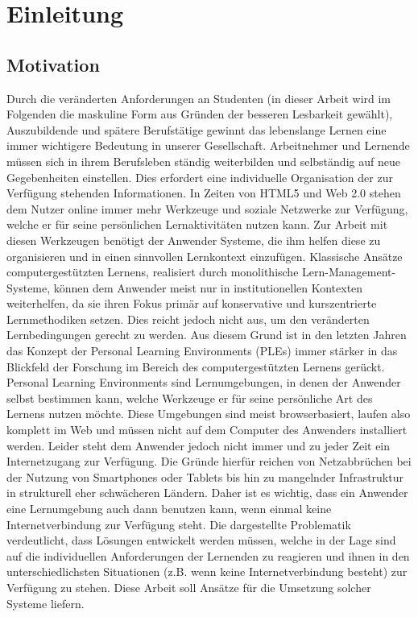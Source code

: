 \chapter{Einleitung}\label{chapter:Kapitel1}

\section{Motivation}
Durch die veränderten Anforderungen an Studenten (in dieser Arbeit wird im Folgenden die maskuline Form aus Gründen der besseren Lesbarkeit gewählt), Auszubildende und spätere Berufstätige gewinnt das lebenslange Lernen eine immer wichtigere Bedeutung in unserer Gesellschaft. Arbeitnehmer und Lernende müssen sich in ihrem Berufsleben ständig weiterbilden und selbständig auf neue Gegebenheiten einstellen. Dies erfordert eine individuelle Organisation der zur Verfügung stehenden Informationen. In Zeiten von HTML5 und Web 2.0 stehen dem Nutzer online immer mehr Werkzeuge und soziale Netzwerke zur Verfügung, welche er für seine persönlichen Lernaktivitäten nutzen kann. Zur Arbeit mit diesen Werkzeugen benötigt der Anwender Systeme, die ihm helfen diese zu organisieren und in einen sinnvollen Lernkontext einzufügen. Klassische Ansätze computergestützten Lernens, realisiert durch monolithische Lern-Management-Systeme, können dem Anwender meist nur in institutionellen Kontexten weiterhelfen, da sie ihren Fokus primär auf konservative und kurszentrierte Lernmethodiken setzen. Dies reicht jedoch nicht aus, um den veränderten Lernbedingungen gerecht zu werden. Aus diesem Grund ist in den letzten Jahren das Konzept der Personal Learning Environments (PLEs) immer stärker in das Blickfeld der Forschung im Bereich des computergestützten Lernens gerückt. Personal Learning Environments sind Lernumgebungen, in denen der Anwender selbst bestimmen kann, welche Werkzeuge er für seine persönliche Art des Lernens nutzen möchte. Diese Umgebungen sind meist browserbasiert, laufen also komplett im Web und müssen nicht auf dem Computer des Anwenders installiert werden. 
Leider steht dem Anwender jedoch nicht immer und zu jeder Zeit ein Internetzugang zur Verfügung. Die Gründe hierfür reichen von Netzabbrüchen bei der Nutzung von Smartphones oder Tablets bis hin zu mangelnder Infrastruktur in strukturell eher schwächeren Ländern. Daher ist es wichtig, dass ein Anwender eine Lernumgebung auch dann benutzen kann, wenn einmal keine Internetverbindung zur Verfügung steht. Die dargestellte Problematik verdeutlicht, dass Lösungen entwickelt werden müssen, welche in der Lage sind auf die individuellen Anforderungen der Lernenden zu reagieren und ihnen in den unterschiedlichsten Situationen (z.B. wenn keine Internetverbindung besteht) zur Verfügung zu stehen. Diese Arbeit soll Ansätze für die Umsetzung solcher Systeme liefern.

